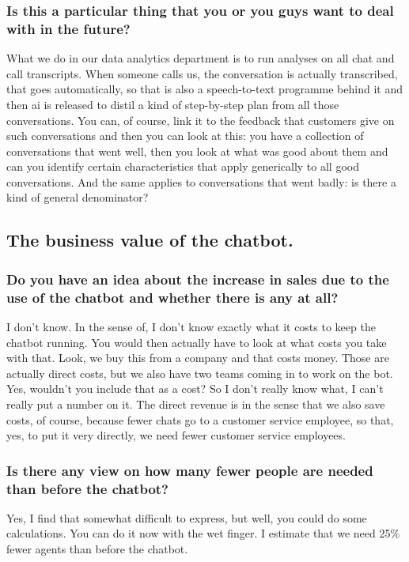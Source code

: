 \begin{appendices}
	\subsubsection{Is this a particular thing that you or you guys want to deal with in the future?}
	What we do in our data analytics department is to run analyses on all chat and call transcripts. When someone calls us, the conversation is actually transcribed, that goes automatically, so that is also a speech-to-text programme behind it and then \acrshort{ai} is released to distil a kind of step-by-step plan from all those conversations. You can, of course, link it to the feedback that customers give on such conversations and then you can look at this: you have a collection of conversations that went well, then you look at what was good about them and can you identify certain characteristics that apply generically to all good conversations. And the same applies to conversations that went badly: is there a kind of general denominator?
	
	\subsection{The business value of the chatbot.}
	\subsubsection{Do you have an idea about the increase in sales due to the use of the chatbot
		and whether there is any at all?}
	I don't know. In the sense of, I don't know exactly what it costs to keep the chatbot running. You would then actually have to look at what costs you take with that. Look, we buy this from a company and that costs money. Those are actually direct costs, but we also have two teams coming in to work on the bot. Yes, wouldn't you include that as a cost? So I don't really know what, I can't really put a number on it. The direct revenue is in the sense that we also save costs, of course, because fewer chats go to a customer service employee, so that, yes, to put it very directly, we need fewer customer service employees.
	
	\subsubsection{Is there any view on how many fewer people are needed than before the chatbot?}
	Yes, I find that somewhat difficult to express, but well, you could do some calculations. You can do it now with the wet finger. I estimate that we need 25\% fewer agents than before the chatbot.
	

\end{appendices}
